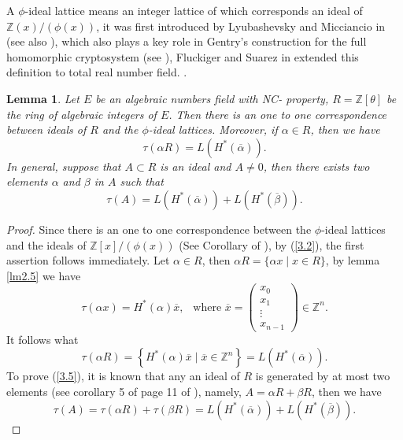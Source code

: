 \documentclass [11pt]{article}
\newtheorem{lem}[thm]{\bf Lemma}
\begin{document}
A $ \phi$-ideal lattice means an integer lattice of which corresponds an ideal of $\mathbb{Z}(x) /(\phi(x))$, it was first introduced by Lyubashevsky and  Micciancio in $ $(see also \cite{Z}), which also plays a key role in  Gentry's construction for the full homomorphic cryptosystem (see \cite{G-a}), Fluckiger and Suarez in \cite{F} extended this definition to total real number field. .



\begin{lem}\label{lm3.1}  Let $E$  be  an  algebraic numbers field with  NC- property, $R=\mathbb{Z}[\theta]$ be the ring of algebraic integers of $E$. Then there is an one to one correspondence  between ideals of $R$ and the $\phi$-ideal  lattices. Moreover, if $\alpha \in R$, then we have
\begin{equation}\label{3.4}
\tau(\alpha R)=L\left(H^{*}(\overline{\alpha})\right).
\end{equation}
In general, suppose that $A \subset R$ is an ideal and $A \neq 0$, then there exists two elements $\alpha$ and $\beta$ in $A$ such that
\begin{equation}\label{3.5}
\tau(A)=L\left(H^{*}(\overline{\alpha})\right)+L\left(H^{*}(\overline{\beta})\right).
\end{equation}
 \end{lem}
 \begin{proof}
 Since there is an one to one correspondence between the $\phi$-ideal lattices and the ideals of $\mathbb{Z}[x] /(\phi(x))$ (See Corollary  of \cite{Z}), by (\ref{3.2}), the first assertion follows immediately. Let $\alpha \in R$, then $\alpha R=\{\alpha x \mid x \in R\}$, by lemma \ref{lm2.5} we have
$$
\tau(\alpha x)=H^{*}(\alpha) \overline{x},\ \  \text { where } \overline{x}= \begin{pmatrix}
     x_0 \\
    x_1  \\
     \vdots \\
     x_{n-1}
\end{pmatrix}\in \mathbb{Z}^{n} .
$$
It follows what
$$
\tau(\alpha R)=\left\{H^{*}(\alpha) \overline{x} \mid \overline{x}\in \mathbb{Z}^{n}\right\}=L\left(H^{*}(\overline{\alpha})\right).
$$
To prove (\ref{3.5}), it is known  that any an ideal of $R$ is generated by at most two elements (see corollary 5 of page 11 of \cite{N} ), namely, $A=\alpha R+\beta R$, then we have
$$
\tau(A)=\tau(\alpha R)+\tau(\beta R)=L\left(H^{*}(\overline{\alpha})\right)+L\left(H^{*}(\overline{\beta})\right).
$$
\end{proof}
\end{document}
